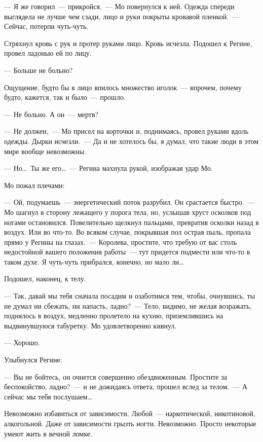 \noindent --- Я же говорил~--- прикройся.~--- Мо повернулся к ней. Одежда спереди выглядела 
не лучше чем сзади, лицо и руки покрыты кровавой пленкой.~--- Сейчас, потерпи 
чуть-чуть.

Стряхнул кровь с рук и протер руками лицо. Кровь исчезла. Подошел к Регине, 
провел ладонью ей по лицу.

\noindent --- Больше не больно?


Ощущение, будто бы в лицо впилось множество иголок~--- впрочем, почему будто, 
кажется, так и было~--- прошло.


\noindent --- Не больно. А он~--- мертв?


\noindent --- Не должен,~--- Мо присел на корточки и, поднимаясь, провел руками вдоль 
одежды. Дырки исчезли.~--- Да и не хотелось бы, я думал, что такие люди в этом мире 
вообще невозможны.


\noindent ---  Но\ldots\ Ты же его\ldots~--- Регина махнула рукой, изображая удар Мо.


Мо пожал плечами:


\noindent ---  Ой, подумаешь~--- энергетический поток разрубил. Он срастается быстро.~--- Мо 
шагнул в сторону лежащего у порога тела, но, услышав хруст осколков под ногами 
остановился. Повелительно щелкнул пальцами, превратив осколки назад в воздух. 
Или во что-то. Во всяком случае, покрывшая пол острая пыль, пропала прямо у 
Регины на глазах.~--- Королева, простите, что требую от вас столь недостойной 
вашего положения работы~--- тут придется подмести или что-то в таком духе. Я 
чуть-чуть прибрался, конечно, но мало ли\ldots


Подошел, наконец, к телу.


\noindent --- Так, давай мы тебя сначала посадим и озаботимся тем, чтобы, очнувшись, ты не 
думал ни сбежать, ни напасть, ладно?~--- Тело, видимо, не желая возражать, 
поднялось в воздух, медленно пролетело на кухню, приземлившись на выдвинувшуюся 
табуретку. Мо удовлетворенно кивнул.


\noindent --- Хорошо.


Улыбнулся Регине:


\noindent --- Вы не бойтесь, он очнется совершенно обездвиженным. Простите за беспокойство, 
ладно?~--- и не дожидаясь ответа, прошел вслед за телом.~--- А сейчас мы тебя 
послушаем\ldots

\newpage

Невозможно избавиться от зависимости. Любой~--- наркотической, никотиновой, 
алкогольной. Даже от зависимости грызть ногти. Невозможно. Просто некоторые 
умеют жить в вечной ломке.


